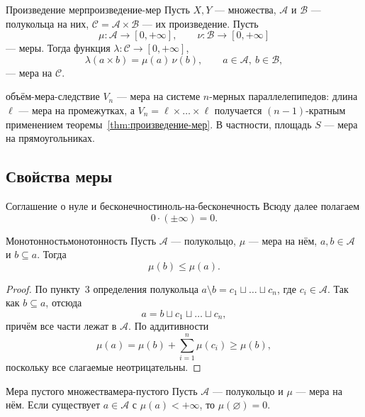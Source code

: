 \begin{Theorem}{Произведение мер}{произведение-мер}
	Пусть $X, Y$ --- множества, $\mathcal{A}$ и $\mathcal{B}$ --- полукольца
	на них, $\mathcal{C} = \mathcal{A} \times \mathcal{B}$ --- их
	произведение. Пусть
	\[
	\mu : \mathcal{A} \to [0,+\infty], \qquad
	\nu : \mathcal{B} \to [0,+\infty]
	\]
	--- меры. Тогда функция $\lambda : \mathcal{C} \to [0,+\infty]$,
	\[
	\lambda(a \times b) = \mu(a)\,\nu(b), \qquad
	a \in \mathcal{A},\ b \in \mathcal{B},
	\]
	--- мера на $\mathcal{C}$.
\end{Theorem}


\begin{Corollary}{}{объём-мера-следствие}
	$V_n$ --- мера на системе $n$-мерных параллелепипедов: длина $\ell$ ---
	мера на промежутках, а $V_n = \ell \times \ldots \times \ell$ получается
	$(n-1)$-кратным применением теоремы~\ref{thm:произведение-мер}. В
	частности, площадь $S$ --- мера на прямоугольниках.
\end{Corollary}

\subsection{Свойства меры}

\begin{Definition}{Соглашение о нуле и бесконечности}{ноль-на-бесконечность}
	Всюду далее полагаем
	\[
	0 \cdot (\pm\infty) = 0 .
	\]
\end{Definition}

\begin{Statement}{Монотонность}{монотонность}
	Пусть $\mathcal{A}$ --- полукольцо, $\mu$ --- мера на нём,
	$a, b \in \mathcal{A}$ и $b \subseteq a$. Тогда
	\[
	\mu(b) \leq \mu(a).
	\]
\end{Statement}

\begin{proof}
	По пункту~3 определения полукольца
	$a \setminus b = c_1 \sqcup \ldots \sqcup c_n$, где $c_i \in \mathcal{A}$.
	Так как $b \subseteq a$, отсюда
	\[
	a = b \sqcup c_1 \sqcup \ldots \sqcup c_n ,
	\]
	причём все части лежат в $\mathcal{A}$. По аддитивности
	\[
	\mu(a) = \mu(b) + \sum_{i=1}^{n} \mu(c_i) \geq \mu(b),
	\]
	поскольку все слагаемые неотрицательны.
\end{proof}

\begin{Statement}{Мера пустого множества}{мера-пустого}
	Пусть $\mathcal{A}$ --- полукольцо и $\mu$ --- мера на нём. Если
	существует $a \in \mathcal{A}$ с $\mu(a) < +\infty$, то
	$\mu(\varnothing) = 0$.
\end{Statement}

